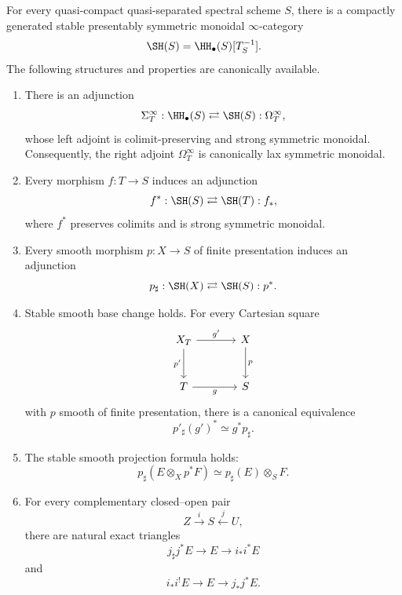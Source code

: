 \begin{theorem}
\label{thm:stable-brave-new-package}
For every quasi-compact quasi-separated spectral scheme $S$, there is a compactly generated stable
presentably symmetric monoidal $\infty$-category
\[
    \SH(S)
    =
    \HH_\bullet(S)[T_S^{-1}].
\]
The following structures and properties are canonically available.

\begin{enumerate}
    \item There is an adjunction
    \[
        \Sigma_T^\infty:
        \HH_\bullet(S)
        \rightleftarrows
        \SH(S):\Omega_T^\infty,
    \]
    whose left adjoint is colimit-preserving and strong symmetric monoidal.
    Consequently, the right adjoint \(\Omega_T^\infty\) is canonically lax
    symmetric monoidal.

    \item Every morphism $f:T\to S$ induces an adjunction
    \[
        f^*:\SH(S)
        \rightleftarrows
        \SH(T):f_*,
    \]
    where $f^*$ preserves colimits and is strong symmetric monoidal.

    \item Every smooth morphism $p:X\to S$ of finite presentation induces an adjunction
    \[
        p_\sharp:\SH(X)
        \rightleftarrows
        \SH(S):p^*.
    \]

    \item Stable smooth base change holds.  For every Cartesian square
    \[
    \begin{tikzcd}[column sep=large,row sep=large]
        X_T \arrow[r,"g'"] \arrow[d,"p'"']
            & X \arrow[d,"p"] \\
        T \arrow[r,"g"'] & S
    \end{tikzcd}
    \]
    with $p$ smooth of finite presentation, there is a canonical equivalence
    \[
        p'_\sharp(g')^*
        \simeq
        g^*p_\sharp.
    \]

    \item The stable smooth projection formula holds:
    \[
        p_\sharp(E\otimes_Xp^*F)
        \simeq
        p_\sharp(E)\otimes_SF.
    \]

    \item For every complementary closed--open pair
    \[
        Z\xrightarrow{i}S\xleftarrow{j}U,
    \]
    there are natural exact triangles
    \[
        j_\sharp j^*E
        \longrightarrow
        E
        \longrightarrow
        i_*i^*E
    \]
    and
    \[
        i_*i^!E
        \longrightarrow
        E
        \longrightarrow
        j_*j^*E.
    \]


\end{enumerate}
\end{theorem}
